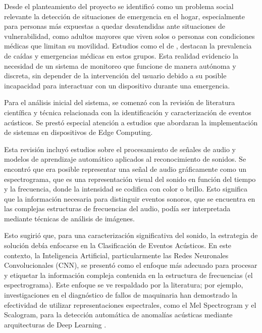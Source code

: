 

Desde el planteamiento del proyecto se identificó como un problema social relevante la detección de situaciones de emergencia en el hogar, especialmente para personas más expuestas a quedar desatendidas ante situaciones de vulnerabilidad, como adultos mayores que viven solos o personas con condiciones médicas que limitan su movilidad. Estudios como el de \cite{bezold2021sensor}, destacan la prevalencia de caídas y emergencias médicas en estos grupos. Esta realidad evidencio la necesidad de un sistema de monitoreo que funcione de manera autónoma y discreta, sin depender de la intervención del usuario debido a su posible incapacidad para interactuar con un dispositivo durante una emergencia.

Para el análisis  inicial del sistema, se comenzó con la revisión de literatura científica y técnica relacionada con la identificación y caracterización de eventos acústicos. Se prestó especial atención a estudios que abordaran la implementación de sistemas en dispositivos de Edge Computing.

Esta revisión incluyó estudios sobre el procesamiento de señales de audio y modelos de aprendizaje automático aplicados al reconocimiento de sonidos. Se encontró que era posible representar una señal de audio gráficamente como un espectrograma, que es una representación visual del sonido en función del tiempo y la frecuencia, donde la intensidad se codifica con color o brillo. Esto significa que la información necesaria para distinguir eventos sonoros, que se encuentra en las complejas estructuras de frecuencias del audio, podía ser interpretada mediante técnicas de análisis de imágenes.

Esto sugirió que, para una caracterización significativa del sonido, la estrategia de solución debía enfocarse en la Clasificación de Eventos Acústicos. En este contexto, la Inteligencia Artificial, particularmente las Redes Neuronales Convolucionales (CNN), se presentó como el enfoque más adecuado para procesar y etiquetar la información compleja contenida en la estructura de frecuencias (el espectrograma). Este enfoque se ve respaldado por la literatura; por ejemplo, investigaciones en el diagnóstico de fallos de maquinaria han demostrado la efectividad de utilizar representaciones espectrales, como el Mel Spectrogram y el Scalogram, para la detección automática de anomalías acústicas mediante arquitecturas de Deep Learning \cite{tran2020drill}.

